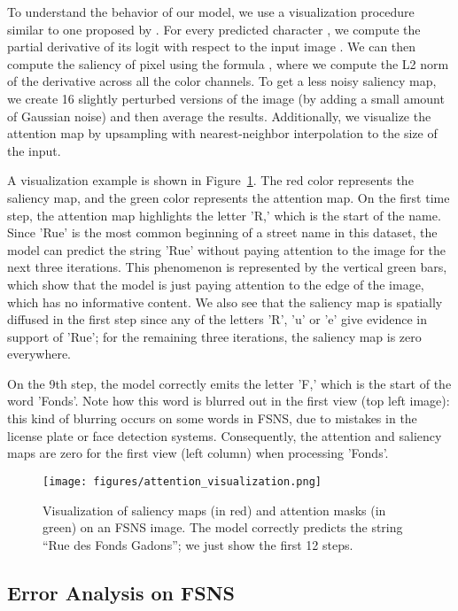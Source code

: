 \documentclass[conference]{IEEEtran}
\begin{document}
To understand the behavior of our model,  we use a visualization
procedure similar to one proposed by \cite{simonyan2013deep}. For
every predicted character , we compute the partial derivative of
its logit  with respect to the input image . We can then
compute the saliency of pixel  using the formula , 
where we compute the L2 norm of the derivative across all the color
channels. To get a less noisy saliency map, we create 16 slightly
perturbed versions of the image (by adding a small amount of Gaussian
noise) and then average the results. Additionally, we visualize the
attention map  by upsampling with nearest-neighbor
interpolation to the size of the input. 

A visualization example is shown in Figure~\ref{fig:saliency}. The red
color represents the saliency map, and the green color represents the
attention map. On the first time step, the attention map highlights the
letter 'R,' which is the start of the name. Since 'Rue' is the most
common beginning of a street name in this dataset, the model can
predict the string 'Rue' without paying attention to the image for the
next three iterations. This phenomenon is represented by the vertical
green bars, which show that the model is just paying attention to the
edge of the image, which has no informative content. We also see that
the saliency map is spatially diffused in the first step since any of the
letters 'R', 'u' or 'e' give evidence in support of 'Rue'; for the
remaining three iterations, the saliency map is zero everywhere. 

On the 9th step, the model correctly emits the letter 'F,' which is
the start of the word 'Fonds'. Note how this word is blurred out in
the first view (top left image): this kind of blurring occurs on some words in FSNS,
due to mistakes in the license plate or face detection systems.
Consequently, the attention and saliency maps are zero for the first
view (left column) when processing 'Fonds'.

\begin{figure}
\begin{center}
\texttt{[image: figures/attention\_visualization.png]}  
\caption{Visualization of saliency maps (in red) and attention masks
  (in green) on an FSNS image.
  The model correctly predicts the string ``Rue des Fonds Gadons''; we
  just show the first 12 steps.
}
\label{fig:saliency}
\end{center}
\end{figure}


\subsection{Error Analysis on FSNS}
\end{document}
